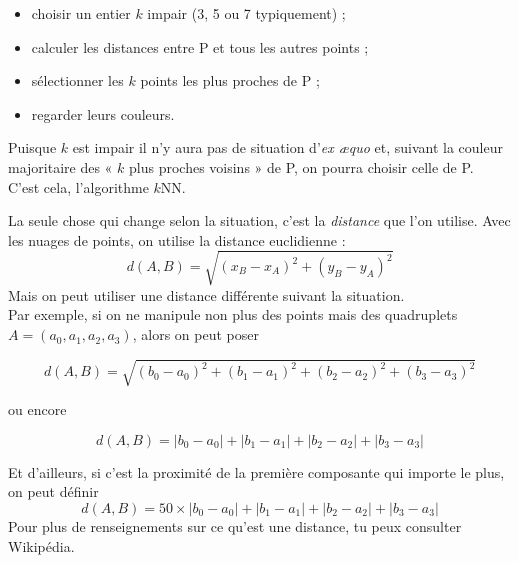 \medskip\par



\begin{methode}[ : kNN]
\begin{itemize}
    \item choisir un entier $k$ impair (3, 5 ou 7 typiquement) ;
    \item calculer les distances entre P et tous les autres points ;
    \item sélectionner les $k$ points les plus proches de P ;	
    \item regarder leurs couleurs.
\end{itemize}
Puisque $k$ est impair il n'y aura pas de situation d'\textit{ex æquo} et, suivant la couleur majoritaire des « $k$ plus proches voisins » de P, on pourra choisir celle de P.\\

C'est cela, l'algorithme $k$NN.
\end{methode}

La seule chose qui change selon la situation, c'est la \textit{distance} que l'on utilise. Avec les nuages de points, on utilise la distance euclidienne :
$$d(A,B)=\sqrt{\left(x_B-x_A\right)^2+\left(y_B-y_A\right)^2}$$
Mais on peut utiliser une distance différente suivant la situation.\\
Par exemple, si on ne manipule non plus des points mais des quadruplets $A=(a_0,a_1,a_2,a_3)$, alors on peut poser

$$d(A,B)=\sqrt{(b_0-a_0)^2+(b_1-a_1)^2+(b_2-a_2)^2+(b_3-a_3)^2}$$

ou encore

$$d(A,B)=|b_0-a_0|+|b_1-a_1|+|b_2-a_2|+|b_3-a_3| $$

Et d'ailleurs, si c'est la proximité de la première composante qui importe le plus, on peut définir
$$d(A,B) =50 \times |b_0-a_0|+|b_1-a_1|+|b_2-a_2|+|b_3-a_3|$$
Pour plus de renseignements sur ce qu'est une distance, tu peux consulter Wikipédia.

